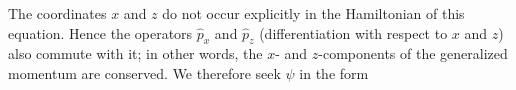 The coordinates $x$ and $z$ do not occur explicitly in the Hamiltonian of this equation. Hence the operators $\hat p_x$ and $\hat p_z$ (differentiation with respect to $x$ and $z$) also commute with it; in other words, the $x$- and $z$-components of the generalized momentum are conserved. We therefore seek $\psi$ in the form

